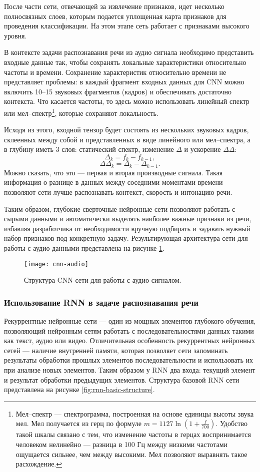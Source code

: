 После части сети, отвечающей за извлечение признаков, идет несколько полносвязных слоев, которым подается уплощенная карта признаков для проведения классификации. На этом этапе сеть работает с признаками высокого уровня.

В контексте задачи распознавания речи из аудио сигнала необходимо представить входные данные так, чтобы сохранять локальные характеристики относительно частоты и времени. Сохранение характеристик относительно времени не представляет проблемы: в каждый фрагмент входных данных для CNN можно включить 10--15 звуковых фрагментов (кадров) и обеспечивать достаточно контекста. Что касается частоты, то здесь можно использовать линейный спектр или мел--спектр\footnote{Мел--спектр --- спектрограмма, построенная на основе единицы высоты звука мел. Мел получается из герц по формуле $m = 1127 \ln \left(1 + \frac{f}{700}\right)$. Удобство такой шкалы связано с тем, что изменение частоты в герцах воспринимается человеком нелинейно --- разница в 100 Гц между низкими частотами ощущается сильнее, чем между высокими. Мел позволяют выравнять такое расхождение.}, которые сохраняют локальность.

Исходя из этого, входной тензор будет состоять из нескольких звуковых кадров, склеенных между собой и представленных в виде линейного или мел--спектра, а в глубину иметь 3 слоя: статический спектр, изменение $\Delta$ и ускорение $\Delta\Delta$:
$$\Delta_k = f_k - f_{k - 1},$$
$$\Delta\Delta_k = \Delta_k - \Delta_{k - 1}.$$
Можно сказать, что это --- первая и вторая производные сигнала. Такая информация о разнице в данных между соседними моментами времени позволяют сети лучше распознавать контекст, скорость и интонацию речи.

Таким образом, глубокие сверточные нейронные сети позволяют работать с сырыми данными и автоматически выделять наиболее важные признаки из речи, избавляя разработчика от необходимости вручную подбирать и задавать нужный набор признаков под конкретную задачу. Результирующая архитектура сети для работы с аудио данными представлена на рисунке \ref{fig:cnn-audio}.
\begin{figure}[h]
	\centering
	\texttt{[image: cnn-audio]}
	\caption{Структура CNN сети для работы с аудио сигналом.}
	\label{fig:cnn-audio}
\end{figure}

\subsubsection{Использование RNN в задаче распознавания речи}
\label{section:rnn-in-asr}
Рекуррентные нейронные сети --- один из мощных элементов глубокого обучения, позволяющий нейронным сетям работать с последовательностями данных такими как текст, аудио или видео. Отличительная особенность рекуррентных нейронных сетей --- наличие внутренней памяти, которая позволяет сети запоминать результаты обработки прошлых элементов последовательности и использовать их при анализе новых элементов. Таким образом у RNN два входа: текущий элемент и результат обработки предыдущих элементов. Структура базовой RNN сети представлена на рисунке \ref{fig:rnn-basic-structure}.

